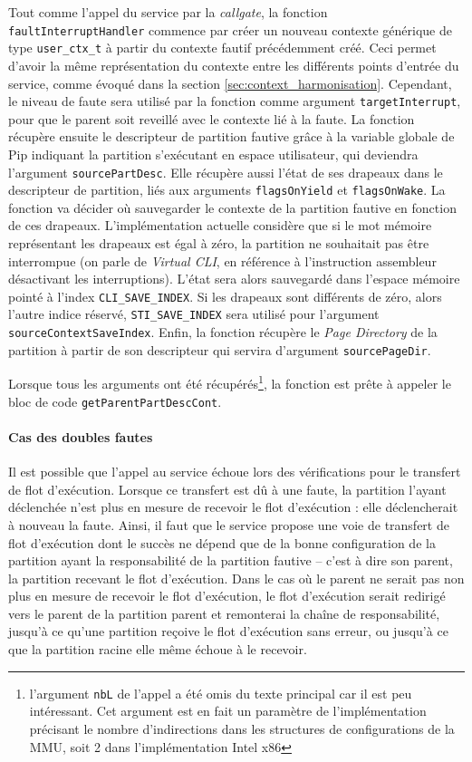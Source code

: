 		Tout comme l'appel du service par la \emph{callgate}, la fonction \texttt{faultInterruptHandler} commence par créer un nouveau contexte générique de type \texttt{user\_ctx\_t} à partir du contexte fautif précédemment créé. Ceci permet d'avoir la même représentation du contexte entre les différents points d'entrée du service, comme évoqué dans la section \ref{sec:context_harmonisation}. Cependant, le niveau de faute sera utilisé par la fonction comme argument \texttt{targetInterrupt}, pour que le parent soit reveillé avec le contexte lié à la faute.
		La fonction récupère ensuite le descripteur de partition fautive grâce à la variable globale de Pip indiquant la partition s'exécutant en espace utilisateur, qui deviendra l'argument \texttt{sourcePartDesc}. Elle récupère aussi l'état de ses drapeaux dans le descripteur de partition, liés aux arguments \texttt{flagsOnYield} et \texttt{flagsOnWake}. La fonction va décider où sauvegarder le contexte de la partition fautive en fonction de ces drapeaux. L'implémentation actuelle considère que si le mot mémoire représentant les drapeaux est égal à zéro, la partition ne souhaitait pas être interrompue (on parle de \emph{Virtual CLI}, en référence à l'instruction assembleur désactivant les interruptions). L'état sera alors sauvegardé dans l'espace mémoire pointé à l'index \texttt{CLI\_SAVE\_INDEX}. Si les drapeaux sont différents de zéro, alors l'autre indice réservé, \texttt{STI\_SAVE\_INDEX} sera utilisé pour l'argument \texttt{sourceContextSaveIndex}.
		Enfin, la fonction récupère le \emph{Page Directory} de la partition à partir de son descripteur qui servira d'argument \texttt{sourcePageDir}.

		Lorsque tous les arguments ont été récupérés\footnote{l'argument \texttt{nbL} de l'appel a été omis du texte principal car il est peu intéressant. Cet argument est en fait un paramètre de l'implémentation précisant le nombre d'indirections dans les structures de configurations de la MMU, soit 2 dans l'implémentation Intel x86}, la fonction est prête à appeler le bloc de code \texttt{getParentPartDescCont}.

		\paragraph{Cas des doubles fautes} Il est possible que l'appel au service échoue lors des vérifications pour le transfert de flot d'exécution. Lorsque ce transfert est dû à une faute, la partition l'ayant déclenchée n'est plus en mesure de recevoir le flot d'exécution : elle déclencherait à nouveau la faute. Ainsi, il faut que le service propose une voie de transfert de flot d'exécution dont le succès ne dépend que de la bonne configuration de la partition ayant la responsabilité de la partition fautive -- c'est à dire son parent, la partition recevant le flot d'exécution.
		Dans le cas où le parent ne serait pas non plus en mesure de recevoir le flot d'exécution, le flot d'exécution serait redirigé vers le parent de la partition parent et remonterai la chaîne de responsabilité, jusqu'à ce qu'une partition reçoive le flot d'exécution sans erreur, ou jusqu'à ce que la partition racine elle même échoue à le recevoir.

